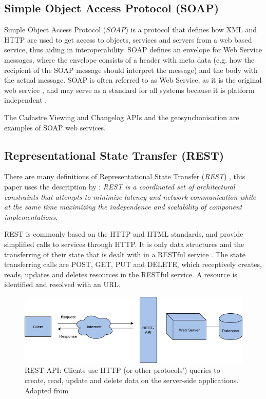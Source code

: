 \subsection{Simple Object Access Protocol (SOAP)}
Simple Object Access Protocol (\textit{SOAP}) is a protocol that defines how XML and HTTP are used to get access to objects, services and servers from a web based service, thus aiding in interoperability. SOAP defines an envelope for Web Service messages, where the envelope consists of a header with meta data (e.g. how the recipient of the SOAP message should interpret the message) and the body with the actual message. SOAP is often referred to as Web Service, as it is the original web service \citep{Kartverket2013}, and may serve as a standard for all systems because it is platform independent \citep{Sipes2004}. 

The Cadastre Viewing and Changelog APIs and the geosynchonisation are examples of SOAP web services. 


\subsection{Representational State Transfer (REST)}
There are many definitions of Representational State Transfer (\textit{REST}) \citep{Fielding, Richardson}, this paper uses the description by \cite{Fieldinga}: \textit{REST is a coordinated set of architectural constraints that attempts to minimize latency and network communication while at the same time maximizing the independence and scalability of component implementations}. 

REST is commonly based on the HTTP and HTML standards, and provide simplified calls to services through HTTP. It is only data structures and the transferring of their state that is dealt with in a RESTful service \citep{Battle2008}. The state transferring calls are POST, GET, PUT and DELETE, which receptively creates, reads, updates and deletes resources in the RESTful service. A resource is identified and resolved with an URL.

\begin{figure}[H]
	\centering
	\includegraphics[scale=0.5]{img/REST}
	\caption{REST-API: Clients use  HTTP (or other protocols') queries to create, read, update and delete data on the server-side applications.  Adapted from \citep{Ceeb2013} }
	\label{fig:rest}
\end{figure}

